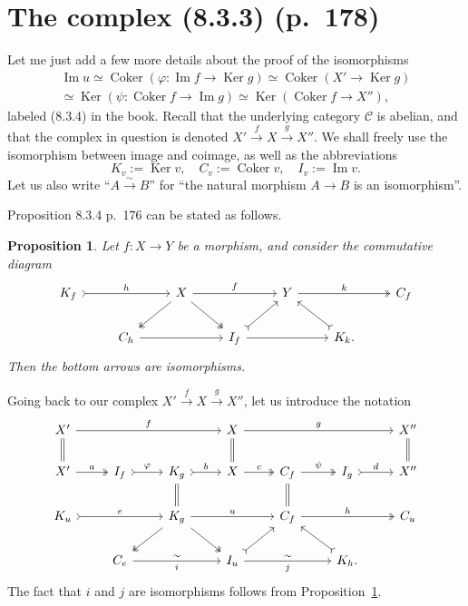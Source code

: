 \documentclass[12pt]{article}
\newtheorem{prop}[thm]{Proposition}
\theoremstyle{remark}%
\newcommand{\C}{\mathcal C}
\newcommand{\p}{\varphi}
\newcommand{\bp}{\begin{prop}}
\newcommand{\ep}{\end{prop}}
\newcommand{\pr}{Proposition}
\DeclareMathOperator{\Coker}{Coker}
\DeclareMathOperator{\Ima}{Im}
\DeclareMathOperator{\Ker}{Ker}
\begin{document}
\section{The complex (8.3.3) (p.~178)}%
%
Let me just add a few more details about the proof of the isomorphisms
\begin{equation}\label{834}
\begin{split}
\Ima u\simeq\Coker(\p:\Ima f\to\Ker g)\simeq\Coker(X'\to\Ker g)\\ 
\simeq\Ker(\psi:\Coker f\to\Ima g)\simeq\Ker(\Coker f\to X''),
\end{split}
\end{equation}
labeled (8.3.4) in the book. Recall that the underlying category $\C$ is abelian, and that the complex in question is denoted $X'\xrightarrow{f}X\xrightarrow{g}X''$. We shall freely use the isomorphism between image and coimage, as well as the abbreviations 
$$
K_v:=\Ker v,\quad C_v:=\Coker v,\quad I_v:=\Ima v.
$$ 
Let us also write ``$A\overset{\sim}{\to}B$'' for ``the natural morphism $A\to B$ is an isomorphism''. 

Proposition 8.3.4 p.~176 can be stated as follows. 
%
\bp\label{p834}
Let $f:X\to Y$ be a morphism, and consider the commutative diagram 
$$
\begin{tikzcd}
K_f\ar[tail]{rr}{h}&&X\ar{rr}{f}\ar[two heads]{dl}\ar[two heads]{dr}&&Y\ar[two heads]{rr}{k}&&C_f\\ 
&C_h\ar{rr}&&I_f\ar[tail]{ur}\ar{rr}&&K_k.\ar[tail]{ul}
\end{tikzcd}
$$ 
Then the bottom arrows are isomorphisms.
\ep
% 
Going back to our complex $X'\overset{f}{\to}X\overset{g}{\to}X''$, let us introduce the notation 
$$
\begin{tikzcd}
X'\ar{rrr}{f}\ar[equal]{d}&&&X\ar[equal]{d}\ar{rrr}{g}&&&X''\ar[equal]{d}\\ 
X'\ar[two heads]{r}{a}&I_f\ar[tail]{r}{\p}&K_g\ar[equal]{d}\ar[tail]{r}{b}&X\ar[two heads]{r}{c}&C_f\ar[equal]{d}\ar[two heads]{r}{\psi}&I_g\ar[tail]{r}{d}&X''\\ 
K_u\ar[tail]{rr}{e}&&K_g\ar[two heads]{dl}\ar[two heads]{dr}\ar{rr}{u}&&C_f\ar[two heads]{rr}{h}&&C_u\\ 
&C_e\ar{rr}{\sim}[swap]{i}&&I_u\ar[tail]{ur}\ar{rr}{\sim}[swap]{j}&&K_h.\ar[tail]{ul}
\end{tikzcd}
$$ 
The fact that $i$ and $j$ are isomorphisms follows from \pr\ \ref{p834}. 
\end{document}
